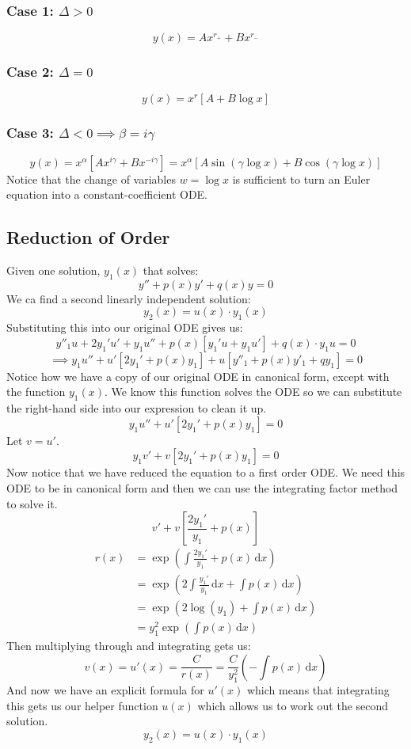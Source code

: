 \documentclass[12pt]{article}
\begin{document}
\subsubsection*{Case 1: \(\Delta>0\)}
\[y(x)=Ax^{r_+}+Bx^{r_-}\]
\subsubsection*{Case 2: \(\Delta=0\)}
\[y(x)=x^r[A+B\log{x}]\]
\subsubsection*{Case 3: \(\Delta<0\implies \beta=i\gamma\)}
\[y(x)=x^\alpha[Ax^{i\gamma}+Bx^{-i\gamma}]=x^{\alpha}[A\sin{(\gamma\log x)+B\cos{(\gamma \log x)}}]\]
Notice that the change of variables \(w=\log x\) is sufficient to turn an Euler equation into a constant-coefficient ODE.
\subsection{Reduction of Order}
Given one solution, \(y_1(x)\) that solves:
\[y''+p(x)y'+q(x)y=0\]
We ca find a second linearly independent solution:
\[y_2(x)=u(x)\cdot y_1(x)\]
Substituting this into our original ODE gives us:
\[y''_1u+2y_1'u'+y_1u''+p(x)[y_1'u+y_1u']+q(x)\cdot y_1u=0\]
\[\implies y_1u''+u'[2y_1'+p(x)y_1]+u[y''_1+p(x)y'_1+qy_1]=0\]
Notice how we have a copy of our original ODE in canonical form, except with the function \(y_1(x)\). We know this function solves the ODE so we can substitute the right-hand side into our expression to clean it up.
\[y_1u''+u'[2y_1'+p(x)y_1]=0\]
Let \(v=u'\).
\[y_1v'+v[2y_1'+p(x)y_1]=0\]
Now notice that we have reduced the equation to a first order ODE. We need this ODE to be in canonical form and then we can use the integrating factor method to solve it.
\[v'+v\left[\frac{2y_1'}{y_1}+p(x)\right]\]
\begin{align*}
    r(x)&=\exp\left(\int\frac{2y_1'}{y_1}+p(x)\,\text{d}x\right) \\
    &=\exp\left(2\int\frac{y_1'}{y_1}\,\text{d}x+\int p(x)\,\text{d}x\right) \\
    &=\exp\left(2\log(y_1)+\int p(x)\,\text{d}x\right) \\
    &= y_1^2\exp\left(\int p(x)\,\text{d}x\right)
\end{align*}
Then multiplying through and integrating gets us:
\[v(x)=u'(x)=\frac{C}{r(x)}=\frac{C}{y_1^2}\left(-\int p(x)\,\text{d}x\right)\]
And now we have an explicit formula for \(u'(x)\) which means that integrating this gets us our helper function \(u(x)\) which allows us to work out the second solution.
\[y_2(x)=u(x)\cdot y_1(x)\]
\end{document}

